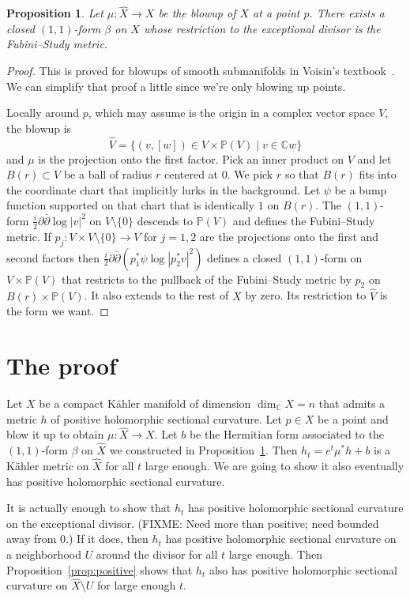 \documentclass[10pt,a4paper]{amsart}
\newtheorem{prop}[theo]{Proposition}
\newcommand{\kk}[1]{\mathbb{#1}}
\def\hsc{holomorphic sectional curvature}
\def\bl#1{\widehat{#1}}
\begin{document}
\begin{prop}
\label{prop:fs}
Let $\mu : \bl X \to X$ be the blowup of $X$ at a point $p$.
There exists a closed $(1,1)$-form $\beta$ on $X$ whose restriction to
the exceptional divisor is the Fubini--Study metric.
\end{prop}

\begin{proof}
This is proved for blowups of smooth submanifolds in
Voisin's textbook~\cite{voisin2002theorie}. We can simplify that proof a little
since we're only blowing up points.

Locally around $p$, which may assume is the origin in a complex vector space
$V$, the blowup is
$$
\bl V
= \{ (v,[w]) \in V \times \kk P(V) \mid v \in \kk C w \}
$$
and $\mu$ is the projection onto the first factor.
Pick an inner product on $V$ and let $B(r) \subset V$ be a ball of radius $r$
centered at $0$.
We pick $r$ so that $B(r)$ fits into the coordinate chart that implicitly lurks
in the background.
Let $\psi$ be a bump function supported on that chart that is identically $1$
on $B(r)$.
The $(1,1)$-form $\frac i2 \partial\bar\partial \log |v|^2$ on $V \setminus
\{0\}$ descends to $\kk P(V)$ and defines the Fubini--Study metric.
If $p_j : V \times V \setminus \{0\} \to V$ for $j = 1,2$ are the projections
onto the first and second factors then
$\frac i2 \partial \bar\partial (p_1^*\psi \log |p_2^*v|^2)$
defines a closed $(1,1)$-form on $V \times \kk P(V)$ that restricts to the
pullback of the Fubini--Study metric by $p_2$ on $B(r) \times \kk P(V)$.
It also extends to the rest of $X$ by zero.
Its restriction to $\bl V$ is the form we want.
\end{proof}



\section{The proof}

Let $X$ be a compact K\"ahler manifold of dimension $\dim_{\kk C} X = n$ that
admits a metric $h$ of positive \hsc.
Let $p \in X$ be a point and blow it up to obtain $\mu : \bl X \to X$.
Let $b$ be the Hermitian form associated to the $(1,1)$-form $\beta$ on $\bl X$
we constructed in Proposition~\ref{prop:fs}.
Then $h_t = e^t \mu^*h + b$ is a K\"ahler metric on $\bl X$ for all $t$ large
enough.
We are going to show it also eventually has positive \hsc.

It is actually enough to show that $h_t$ has positive \hsc{} on the exceptional
divisor.
(FIXME: Need more than positive; need bounded away from $0$.)
If it does, then $h_t$ has positive \hsc{} on a neighborhood $U$ around the
divisor for all $t$ large enough.
Then Proposition~\ref{prop:positive} shows that $h_t$ also has positive \hsc{}
on $\bl X \setminus U$ for large enough $t$.
\end{document}
